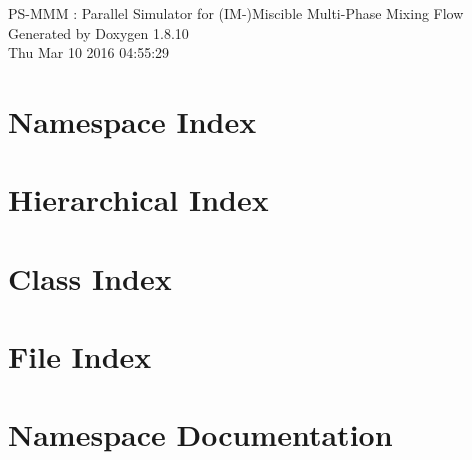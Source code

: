 \documentclass[twoside]{article}
\newcommand{\+}{\discretionary{\mbox{\scriptsize$\hookleftarrow$}}{}{}}
\begin{document}
\hypersetup{pageanchor=false,
             bookmarks=true,
             bookmarksnumbered=true,
             pdfencoding=unicode
            }
\begin{titlepage}
\vspace*{7cm}
\begin{center}%
{\Large P\+S-\/\+M\+M\+M \+: Parallel Simulator for (I\+M-\/)Miscible Multi-\/\+Phase Mixing Flow }\\
\vspace*{1cm}
{\large Generated by Doxygen 1.8.10}\\
\vspace*{0.5cm}
{\small Thu Mar 10 2016 04:55:29}\\
\end{center}
\end{titlepage}
\tableofcontents
{}
\hypersetup{pageanchor=true}

\section{Namespace Index}

\section{Hierarchical Index}

\section{Class Index}

\section{File Index}

\section{Namespace Documentation}









\end{document}
